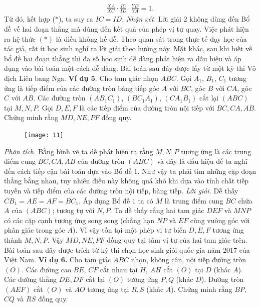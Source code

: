 \begin{multicols}{2}
	\begin{align*}
		\frac{XA}{XC}\cdot \frac{IC}{ID}\cdot\frac{YD}{YA} = 1.
	\end{align*}
	Từ đó, kết hợp ($*$), ta suy ra $IC=ID$.
	\vskip 0.1cm
	\textit{Nhận xét.}  Lời giải $2$ không dùng đến Bổ đề về hai đoạn thẳng mà dùng đến kết quả của phép vị tự quay. Việc phát hiện ra hệ thức $(*)$ là điều không hề dễ. Theo quan sát trong thực tế dạy học của tác giả, rất ít học sinh nghĩ ra  lời giải theo hướng này. Mặt khác, sau khi biết về bổ đề hai đoạn thẳng thì đa số học sinh dễ dàng phát hiện ra dấu hiệu và áp dụng vào bài toán một cách dễ dàng.
	\vskip 0.1cm
	Bài toán sau đây được lấy từ một kỳ thi Vô địch Liên bang Nga.
	\vskip 0.1cm
	\textbf{\color{diendantoanhoc}Ví dụ $\pmb{5.}$} Cho tam giác nhọn $ABC$. Gọi $A_1$, $B_1$, $C_1$ tương ứng là tiếp điểm của các đường tròn bàng tiếp góc $A$ với $BC$, góc $B$ với $CA$, góc $C$ với $AB$. Các đường tròn $(AB_1C_1)$, $(BC_1A_1)$, $(CA_1B_1)$ cắt lại $(ABC)$ tại $M,N,P$. Gọi $D,E,F$ là các tiếp điểm của đường tròn nội tiếp với $BC,CA,AB$. Chứng minh rằng $MD,NE,PF$ đồng quy.
	\begin{figure}[H]
		\vspace*{-5pt}
		\centering
		\captionsetup{labelformat= empty, justification=centering}
		\texttt{[image: 11]}
		\vspace*{-10pt}
	\end{figure}
	\textit{Phân tích.} Bằng hình vẽ ta dễ phát hiện ra rằng $M,N,P$ tương ứng là các trung điểm cung $BC,CA,AB$ của đường tròn $(ABC)$ và đây là dấu hiệu để ta nghĩ đến cách tiếp cận bài toán dựa vào Bổ đề $1$. Như vậy ta phải tìm những cặp đoạn thẳng bằng nhau, tuy nhiên điều này không quá khó khi dựa vào tính chất tiếp tuyến và tiếp điểm của các đường tròn nội tiếp, bàng tiếp.
	\vskip 0.1cm
	\textit{Lời giải.} Dễ thấy $CB_1 =AE=AF=BC_1$. Áp dụng Bổ đề $1$ ta có $M$ là trung điểm cung $BC$ chứa $A$ của $(ABC)$; tương tự với $N,P.$ Ta dễ thấy rằng hai tam giác $DEF$ và $MNP$ có các cặp cạnh tương ứng song song (chẳng hạn $NP$ và $EF$ cùng vuông góc với phân giác trong góc $A$). Vì vậy tồn tại một phép vị tự biến $D,E,F$ tương ứng thành $M,N,P$. Vậy $MD,NE,PF$ đồng quy tại tâm vị tự của hai tam giác trên. 
	\vskip 0.1cm
	Bài toán sau đây được trích từ kỳ thi chọn học sinh giỏi quốc gia năm 2017 của Việt Nam.
	\textbf{\color{diendantoanhoc}Ví dụ 6.} Cho tam giác $ABC$ nhọn, không cân, nội tiếp đường tròn $(O)$. Các đường cao $BE$, $CF$ cắt nhau tại $H$, $AH$ cắt $(O)$ tại $D$  (khác $A$). Các đường thẳng $DE,DF$ cắt lại $(O)$ tương ứng  $P,Q$ (khác $D$). Đường tròn $(AEF)$ cắt $(O)$ và $AO$ tương ứng tại $R,S$ (khác $A$). Chứng minh rằng $BP$, $CQ$ và $RS$ đồng quy.

\end{multicols}
